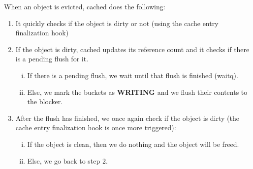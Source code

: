 When an object is evicted, cached does the following:

\begin{enumerate}
	\item It quickly checks if the object is dirty or not (using the cache 
		entry finalization hook)
	\item If the object is dirty, cached updates its reference count and it 
		checks if there is a pending flush for it.
		\begin{enumerate}[i)]
			\item If there is a pending flush, we wait until that 
				flush is finished (waitq).
			\item Else, we mark the buckets as \textbf{WRITING} and 
				we flush their contents to the blocker.
		\end{enumerate}
	\item After the flush has finished, we once again check if the object 
		is dirty (the cache entry finalization hook is once more 
		triggered):
		\begin{enumerate}[i)]
			\item If the object is clean, then we do nothing and 
				the object will be freed.
			\item Else, we go back to step 2.		
		\end{enumerate}
\end{enumerate}

